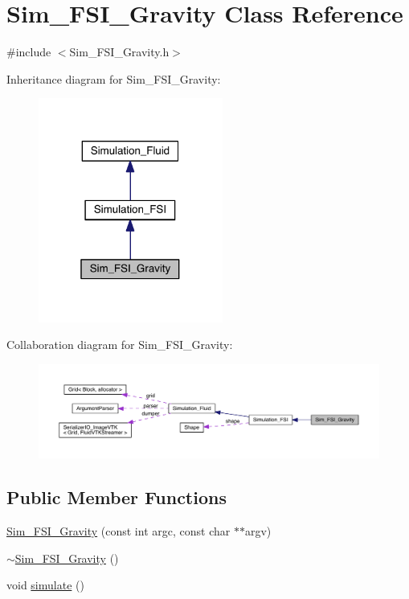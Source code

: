 \hypertarget{class_sim___f_s_i___gravity}{}\section{Sim\+\_\+\+F\+S\+I\+\_\+\+Gravity Class Reference}
\label{class_sim___f_s_i___gravity}


{\ttfamily \#include $<$Sim\+\_\+\+F\+S\+I\+\_\+\+Gravity.\+h$>$}



Inheritance diagram for Sim\+\_\+\+F\+S\+I\+\_\+\+Gravity\+:
\nopagebreak
\begin{figure}[H]
\begin{center}
\leavevmode
\includegraphics[width=172pt]{df/d74/class_sim___f_s_i___gravity__inherit__graph}
\end{center}
\end{figure}


Collaboration diagram for Sim\+\_\+\+F\+S\+I\+\_\+\+Gravity\+:
\nopagebreak
\begin{figure}[H]
\begin{center}
\leavevmode
\includegraphics[width=350pt]{d8/d6b/class_sim___f_s_i___gravity__coll__graph}
\end{center}
\end{figure}
\subsection*{Public Member Functions}
\begin{DoxyCompactItemize}
\item 
\hyperlink{class_sim___f_s_i___gravity_a66f07ee31fb03d03da96cb53ec48af9d}{Sim\+\_\+\+F\+S\+I\+\_\+\+Gravity} (const int argc, const char $\ast$$\ast$argv)
\item 
\hyperlink{class_sim___f_s_i___gravity_ae64d227ac1845eecae168f8293f78432}{$\sim$\+Sim\+\_\+\+F\+S\+I\+\_\+\+Gravity} ()
\item 
void \hyperlink{class_sim___f_s_i___gravity_add86d6f52de51511f0bb93714fc504c4}{simulate} ()
\end{DoxyCompactItemize}
